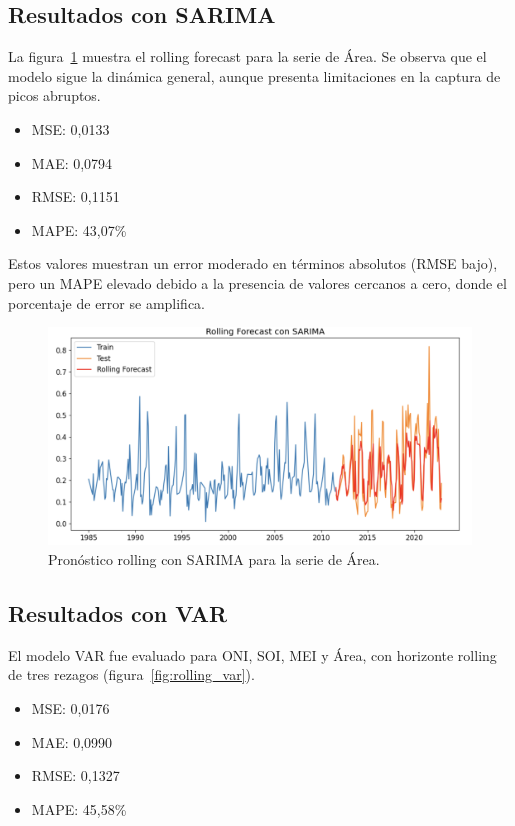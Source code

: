 \subsection{Resultados con SARIMA}

La figura~\ref{fig:rolling_sarima} muestra el rolling forecast para la serie de Área. Se observa que el modelo sigue la dinámica general, aunque presenta limitaciones en la captura de picos abruptos.

\begin{itemize}
    \item MSE: 0,0133
    \item MAE: 0,0794
    \item RMSE: 0,1151
    \item MAPE: 43,07\%
\end{itemize}

Estos valores muestran un error moderado en términos absolutos (RMSE bajo), pero un MAPE elevado debido a la presencia de valores cercanos a cero, donde el porcentaje de error se amplifica.

\begin{figure}[H]
    \centering
    \includegraphics[scale=0.35]{Figures/rolling_sarima.png}
    \caption{Pronóstico rolling con SARIMA para la serie de Área.}
    \label{fig:rolling_sarima}
\end{figure}

\subsection{Resultados con VAR}

El modelo VAR fue evaluado para ONI, SOI, MEI y Área, con horizonte rolling de tres rezagos (figura~\ref{fig:rolling_var}).

\begin{itemize}
    \item MSE: 0,0176
    \item MAE: 0,0990
    \item RMSE: 0,1327
    \item MAPE: 45,58\%
\end{itemize}

